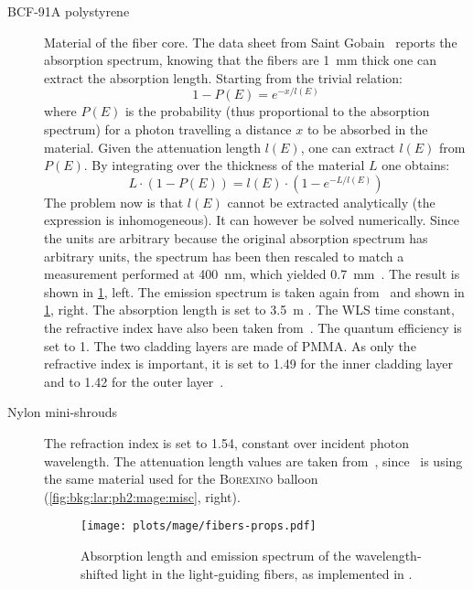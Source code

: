 \begin{description}

  \item[BCF-91A polystyrene] Material of the fiber core. The data sheet from Saint
    Gobain~\cite{FibersData} reports the absorption spectrum, knowing that the fibers are
    1~mm thick one can extract the absorption length. Starting from the trivial relation:
    \[
      1 - P(E) = e^{-x/l(E)}
    \]
    where $P(E)$ is the probability (thus proportional to the absorption
    spectrum) for a photon travelling a distance $x$ to be absorbed in the
    material. Given the attenuation length $l(E)$, one can extract $l(E)$ from
    $P(E)$. By integrating over the thickness of the material $L$ one obtains:
    \[
      L \cdot (1 - P(E)) = l(E) \cdot (1 - e^{-L/l(E)})
    \]
    The problem now is that $l(E)$ cannot be extracted analytically (the expression is
    inhomogeneous). It can however be solved numerically.  Since the units are arbitrary
    because the original absorption spectrum has arbitrary units, the spectrum has been
    then rescaled to match a measurement performed at 400~nm, which yielded
    0.7~mm~\cite{Raphael Kneissl's bachelor thesis}. The result is shown in
    \cref{fig:bkg:lar:ph2:mage:fibers-props}, left. The emission spectrum is taken again
    from~\cite{FibersData} and shown in \cref{fig:bkg:lar:ph2:mage:fibers-props}, right.
    The absorption length is set to 3.5~m . The WLS time constant, the
    refractive index have also been taken from~\cite{FibersData}. The quantum efficiency
    is set to 1. The two cladding layers are made of PMMA. As only the refractive index is
    important, it is set to 1.49 for the inner cladding layer and to 1.42 for the outer
    layer~\cite{FibersData}.

  \item[Nylon mini-shrouds] The refraction index is set to 1.54, constant over
    incident photon wavelength. The attenuation length values are taken
    from~\cite{Agostini2017a}, since \gerda\ is using the same material used for the
    \textsc{Borexino} balloon (\cref{fig:bkg:lar:ph2:mage:misc}, right).

    \begin{figure}
      \centering
      \texttt{[image: plots/mage/fibers-props.pdf]}
      \caption{%
        Absorption length and emission spectrum of the wavelength-shifted light in the
        light-guiding fibers, as implemented in \mage.
      }\label{fig:bkg:lar:ph2:mage:fibers-props}
    \end{figure}

\end{description}

